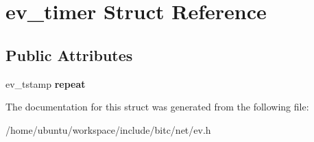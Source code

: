 \hypertarget{structev__timer}{\section{ev\-\_\-timer Struct Reference}
\label{structev__timer}
}
\subsection*{Public Attributes}
\begin{DoxyCompactItemize}
\item 
\hypertarget{structev__timer_a4d2b34c259adabc6ddc738b89341c249}{ev\-\_\-tstamp {\bfseries repeat}}\label{structev__timer_a4d2b34c259adabc6ddc738b89341c249}

\end{DoxyCompactItemize}


The documentation for this struct was generated from the following file\-:\begin{DoxyCompactItemize}
\item 
/home/ubuntu/workspace/include/bitc/net/ev.\-h\end{DoxyCompactItemize}
